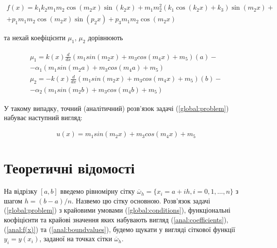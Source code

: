\begin{equation}
\begin{multlined} \label{anal:f(x)}  
f(x) = k_1 k_2 m_1 m_2 \cos(m_2 x) \sin(k_2 x) + m_1 m_2^2 \left(k_1 \cos(k_2 x) + k_3 \right)\sin(m_2 x) + \\ + p_1 m_1 m_2 \cos(m_2 x) \sin(p_2 x) +
p_3 m_1 m_2 \cos(m_2 x)
\end{multlined}
\end{equation}

та нехай коефіцієнти $\mu_1$, $\mu_2$ дорівнюють

\begin{align}
\begin{split} \label{anal:boundvalues}
\mu_1 = k(x)\frac{d}{dx}\left(m_1 sin(m_2 x) + m_3 cos(m_4 x) + m_5 \right)(a) - \\ - \alpha_1 \left(m_1 sin(m_2 a) + m_3 cos(m_4 a) + m_5 \right) \\
\mu_2 = - k(x)\frac{d}{dx}\left(m_1 sin(m_2 x) + m_3 cos(m_4 x) + m_5 \right)(b) - \\ - \alpha_2 \left(m_1 sin(m_2 b) + m_3 cos(m_4 b) + m_5 \right)
\end{split}
\end{align}

У такому випадку, точний (аналітичний) розв'язок задачі (\ref{global:problem}) набуває наступний вигляд:

\begin{equation} \label{anal:solution}  
\begin{split}
u(x) = m_1 sin(m_2 x) + m_3 cos(m_4 x) + m_5
\end{split}					
\end{equation}


\section{Теоретичні відомості}

На відрізку $[a, b]$ введемо рівномірну сітку $\overline{\omega}_h = \{x_i = a + ih, i = 0, 1, \dots, n\}$ з шагом $h = {(b-a)}/{n}$. Назвемо цю сітку основною. Розв'язок задачі (\ref{global:problem}) з крайовими умовами (\ref{global:conditions}), функціональні коєфіцієнти та крайові значення яких набувають вигляд (\ref{anal:coefficients}), (\ref{anal:f(x)}) та (\ref{anal:boundvalues}), будемо щукати у вигляді сіткової функції \( y_i = y(x_i)\), заданої на точках сітки \(\overline{\omega}_h\).  

